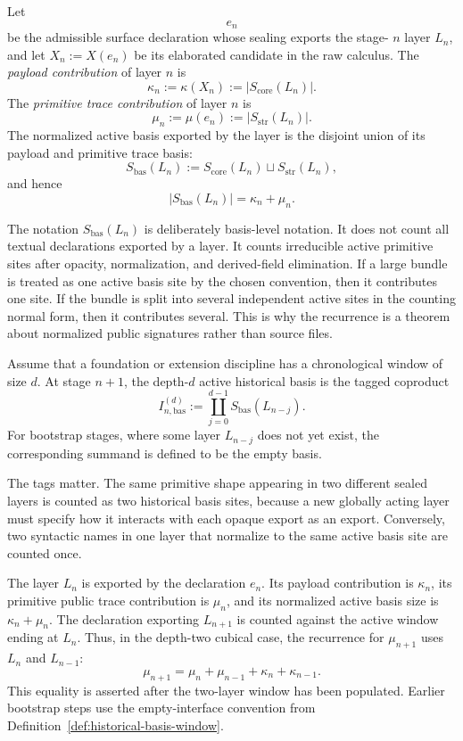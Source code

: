 \documentclass{lmcs}
\begin{document}
\begin{defi}
\label{def:layerwise-payload-trace}
Let
\[
  e_n
\]
be the admissible surface declaration whose sealing exports the stage-
\(n\) layer \(L_n\), and let \(X_n := X(e_n)\) be its elaborated candidate in the raw calculus.
The \emph{payload contribution} of layer \(n\) is
\[
  \kappa_n := \kappa(X_n) := |S_{\mathrm{core}}(L_n)|.
\]
The \emph{primitive trace contribution} of layer \(n\) is
\[
  \mu_n := \mu(e_n) := |S_{\mathrm{str}}(L_n)|.
\]
The normalized active basis exported by the layer is the disjoint union of its payload and
primitive trace basis:
\[
  S_{\mathrm{bas}}(L_n)
  := S_{\mathrm{core}}(L_n) \sqcup S_{\mathrm{str}}(L_n),
\]
and hence
\[
  |S_{\mathrm{bas}}(L_n)| = \kappa_n + \mu_n.
\]
\end{defi}

The notation \(S_{\mathrm{bas}}(L_n)\) is deliberately basis-level notation.  It does not count
all textual declarations exported by a layer.  It counts irreducible active primitive sites
after opacity, normalization, and derived-field elimination.  If a large bundle is treated as
one active basis site by the chosen convention, then it contributes one site.  If the bundle is
split into several independent active sites in the counting normal form, then it contributes
several.  This is why the recurrence is a theorem about normalized public signatures rather
than source files.

\begin{defi}
\label{def:historical-basis-window}
Assume that a foundation or extension discipline has a chronological window of size \(d\).
At stage \(n+1\), the depth-\(d\) active historical basis is the tagged coproduct
\[
  I^{(d)}_{n,\mathrm{bas}}
  :=
  \coprod_{j=0}^{d-1} S_{\mathrm{bas}}(L_{n-j}).
\]
For bootstrap stages, where some layer \(L_{n-j}\) does not yet exist, the corresponding
summand is defined to be the empty basis.
\end{defi}

The tags matter.  The same primitive shape appearing in two different sealed layers is counted
as two historical basis sites, because a new globally acting layer must specify how it
interacts with each opaque export as an export.  Conversely, two syntactic names in one layer
that normalize to the same active basis site are counted once.

\begin{rem}
\label{rem:scaling-indexing}
The layer \(L_n\) is exported by the declaration \(e_n\).  Its payload contribution is
\(\kappa_n\), its primitive public trace contribution is \(\mu_n\), and its normalized active
basis size is \(\kappa_n+\mu_n\).  The declaration exporting \(L_{n+1}\) is counted against
the active window ending at \(L_n\).  Thus, in the depth-two cubical case, the recurrence for
\(\mu_{n+1}\) uses \(L_n\) and \(L_{n-1}\):
\[
  \mu_{n+1}
  = \mu_n + \mu_{n-1} + \kappa_n + \kappa_{n-1}.
\]
This equality is asserted after the two-layer window has been populated.  Earlier bootstrap
steps use the empty-interface convention from Definition~\ref{def:historical-basis-window}.
\end{rem}
\end{document}
